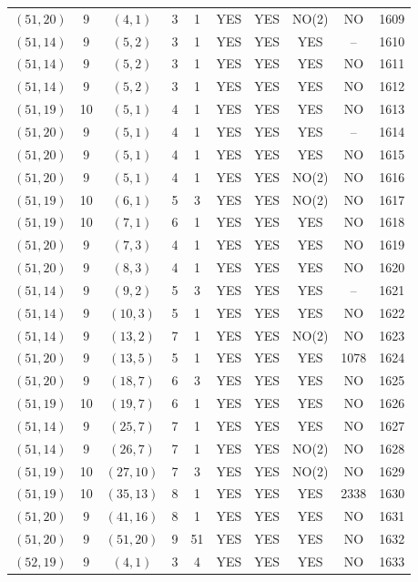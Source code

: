 \begin{longtable}{|c|c|c|c|c|c|c|c|c|c|}
$(51, 20)$ & 9 & $(4, 1)$ & 3 & 1 & YES & YES & NO(2) & NO & 1609\\
$(51, 14)$ & 9 & $(5, 2)$ & 3 & 1 & YES & YES & YES & -- & 1610\\
$(51, 14)$ & 9 & $(5, 2)$ & 3 & 1 & YES & YES & YES & NO & 1611\\
$(51, 14)$ & 9 & $(5, 2)$ & 3 & 1 & YES & YES & YES & NO & 1612\\
$(51, 19)$ & 10 & $(5, 1)$ & 4 & 1 & YES & YES & YES & NO & 1613\\
$(51, 20)$ & 9 & $(5, 1)$ & 4 & 1 & YES & YES & YES & -- & 1614\\
$(51, 20)$ & 9 & $(5, 1)$ & 4 & 1 & YES & YES & YES & NO & 1615\\
$(51, 20)$ & 9 & $(5, 1)$ & 4 & 1 & YES & YES & NO(2) & NO & 1616\\
$(51, 19)$ & 10 & $(6, 1)$ & 5 & 3 & YES & YES & NO(2) & NO & 1617\\
$(51, 19)$ & 10 & $(7, 1)$ & 6 & 1 & YES & YES & YES & NO & 1618\\
$(51, 20)$ & 9 & $(7, 3)$ & 4 & 1 & YES & YES & YES & NO & 1619\\
$(51, 20)$ & 9 & $(8, 3)$ & 4 & 1 & YES & YES & YES & NO & 1620\\
$(51, 14)$ & 9 & $(9, 2)$ & 5 & 3 & YES & YES & YES & -- & 1621\\
$(51, 14)$ & 9 & $(10, 3)$ & 5 & 1 & YES & YES & YES & NO & 1622\\
$(51, 14)$ & 9 & $(13, 2)$ & 7 & 1 & YES & YES & NO(2) & NO & 1623\\
$(51, 20)$ & 9 & $(13, 5)$ & 5 & 1 & YES & YES & YES & 1078 & 1624\\
$(51, 20)$ & 9 & $(18, 7)$ & 6 & 3 & YES & YES & YES & NO & 1625\\
$(51, 19)$ & 10 & $(19, 7)$ & 6 & 1 & YES & YES & YES & NO & 1626\\
$(51, 14)$ & 9 & $(25, 7)$ & 7 & 1 & YES & YES & YES & NO & 1627\\
$(51, 14)$ & 9 & $(26, 7)$ & 7 & 1 & YES & YES & NO(2) & NO & 1628\\
$(51, 19)$ & 10 & $(27, 10)$ & 7 & 3 & YES & YES & NO(2) & NO & 1629\\
$(51, 19)$ & 10 & $(35, 13)$ & 8 & 1 & YES & YES & YES & 2338 & 1630\\
$(51, 20)$ & 9 & $(41, 16)$ & 8 & 1 & YES & YES & YES & NO & 1631\\
$(51, 20)$ & 9 & $(51, 20)$ & 9 & 51 & YES & YES & YES & NO & 1632\\
$(52, 19)$ & 9 & $(4, 1)$ & 3 & 4 & YES & YES & YES & NO & 1633\\

\end{longtable}

